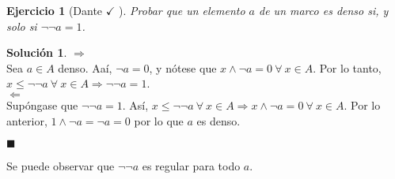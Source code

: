 \documentclass[12pt,letterpaper,titlepage]{article}
\newtheorem{exe}{Ejercicio}
\theoremstyle{definition}
\newtheorem*{sol}{Solución}
\renewcommand\inf{\wedge}
\newcommand\<{\langle}
\renewcommand\>{\rangle}
\begin{document}
\begin{exe}[Dante $\checkmark$ ]
  Probar que un elemento $a$ de un marco es denso
  si, y solo si $\neg\neg a = 1$.
\end{exe}
\begin{sol}
$\Rightarrow$\\
Sea $a\in A$ denso. Aaí, $\neg a=0$, y nótese que $x\inf\neg a=0 \ \forall \ x\in A$. Por lo tanto, $x\leq \neg\neg a \ \forall \ x\in A \Rightarrow \neg\neg a=1$.\\
$\Leftarrow$\\
Supóngase que $\neg\neg a=1$. Así, $x\leq \neg\neg a \ \forall \ x\in A\Rightarrow x\inf \neg a=0 \ \forall \ x \in A$. Por lo anterior, $1\inf\neg a=\neg a=0$ por lo que $a$ es denso.\vspace{3mm}

\hfill $\blacksquare$
\end{sol}\vspace{3mm}

    
Se puede observar que $\neg\neg a$ es regular para todo $a$.
\end{document}
